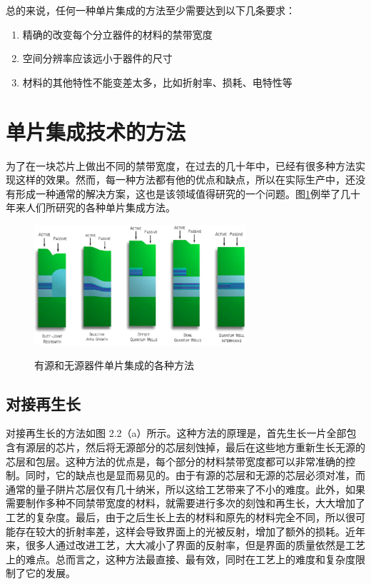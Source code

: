 \documentclass[oneside]{ZJUthesis}
\begin{document}
总的来说，任何一种单片集成的方法至少需要达到以下几条要求：

\begin{enumerate}
\item{精确的改变每个分立器件的材料的禁带宽度}
\item{空间分辨率应该远小于器件的尺寸}
\item{材料的其他特性不能变差太多，比如折射率、损耗、电特性等}
\end{enumerate}

\section{单片集成技术的方法}

为了在一块芯片上做出不同的禁带宽度，在过去的几十年中，已经有很多种方法实现这样的效果。然而，每一种方法都有他的优点和缺点，所以在实际生产中，还没有形成一种通常的解决方案，这也是该领域值得研究的一个问题。图\ref{fig_pic_methods}例举了几十年来人们所研究的各种单片集成方法。

\begin{figure}[!h]
  \centering
  \includegraphics[width=0.7\textwidth]{./Pictures/pic_methods.eps}\\
  \caption{有源和无源器件单片集成的各种方法}
  \label{fig_pic_methods}
\end{figure}

\subsection{对接再生长}

对接再生长的方法如图 2.2（a）所示。这种方法的原理是，首先生长一片全部包含有源层的芯片，然后将无源部分的芯层刻蚀掉，最后在这些地方重新生长无源的芯层和包层。这种方法的优点是，每个部分的材料禁带宽度都可以非常准确的控制。同时，它的缺点也是显而易见的。由于有源的芯层和无源的芯层必须对准，而通常的量子阱片芯层仅有几十纳米，所以这给工艺带来了不小的难度。此外，如果需要制作多种不同禁带宽度的材料，就需要进行多次的刻蚀和再生长，大大增加了工艺的复杂度。最后，由于之后生长上去的材料和原先的材料完全不同，所以很可能存在较大的折射率差，这样会导致界面上的光被反射，增加了额外的损耗。近年来，很多人通过改进工艺，大大减小了界面的反射率，但是界面的质量依然是工艺上的难点。总而言之，这种方法最直接、最有效，同时在工艺上的难度和复杂度限制了它的发展。
\end{document}
